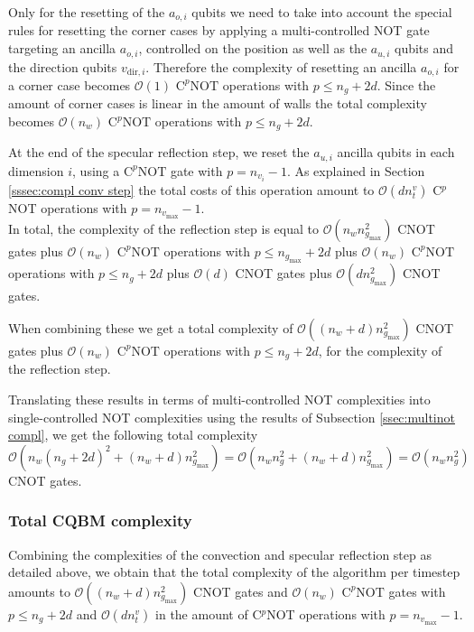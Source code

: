 Only for the resetting of the $a_{o,i}$ qubits we need to take into account the special rules for resetting the corner cases by applying a multi-controlled NOT gate targeting an ancilla $a_{o,i}$, controlled on the position as well as the $a_{u,i}$ qubits and the direction qubits $v_{\text{dir},i}$. Therefore the complexity of resetting an ancilla $a_{o,i}$ for a corner case becomes $\mathcal{O}\left (  1 \right )$ $\text{C}^{p}\text{NOT}$ operations with $p \leq n_g +2d$. Since the amount of corner cases is linear in the amount of walls the total complexity becomes $\mathcal{O}\left (  n_w  \right )$ $\text{C}^{p}\text{NOT}$
operations with $p \leq n_g +2d$.

At the end of the specular reflection step, we reset the $a_{u,i}$ ancilla qubits in each dimension $i$, using a $\text{C}^p\text{NOT}$ gate with $p=n_{v_i}-1$. 
As explained in Section \ref{sssec:compl conv step} the total costs of this operation amount to $\mathcal{O} \left ( d n^v_t \right )$ C$^p$NOT operations with $p=n_{v_\text{max}}-1$. \\

In total, the complexity of the reflection step is equal to
$\mathcal{O} \left ( n_w n_{g_\text{max}}^2 \right) $ CNOT gates plus $\mathcal{O}\left ( n_w \right )$ $\text{C}^{p}\text{NOT}$ operations with $p \leq n_{g_\text{max}} +2d $ plus $\mathcal{O}\left (  n_w  \right )$ $\text{C}^{p}\text{NOT}$
operations with $p \leq n_g +2d$ plus $\mathcal{O}\left ( d\right )$ CNOT gates plus $\mathcal{O} \left (d n_{g_\text{max}}^2 \right )$ CNOT gates. 

When combining these we get a total complexity of $\mathcal{O} \left ( (n_w + d)  n_{g_\text{max}}^2  \right)  $ CNOT gates
plus $\mathcal{O}\left (  n_w  \right )$ $\text{C}^{p}\text{NOT}$
operations with $p \leq n_g +2d$, for the complexity of the reflection step. 

Translating these results in terms of multi-controlled NOT complexities into single-controlled NOT complexities using the results of Subsection \ref{ssec:multinot compl}, we get the following total complexity 
$$\mathcal{O}\left (  n_w \left ( n_g +2d \right)^2 + (n_w + d)  n_{g_\text{max}}^2 \right  ) = \mathcal{O}\left (  n_w n_g^2+ (n_w + d)  n_{g_\text{max}}^2 \right ) = \mathcal{O}\left (  n_w n_g^2 \right )$$ CNOT gates.

\subsubsection{Total CQBM complexity}
Combining the complexities of the convection and specular reflection step as detailed above, we obtain that the total complexity of the algorithm per timestep amounts to $\mathcal{O} \left ( (n_w + d)  n_{g_\text{max}}^2  \right)  $ CNOT gates and $\mathcal{O} \left ( n_w \right )$ $\text{C}^{p}\text{NOT}$ gates with $p \leq n_g +2d$ and $\mathcal{O} \left ( d n^v_t \right )$ in the amount of C$^p$NOT operations with $p=n_{v_\text{max}}-1$.  \\


